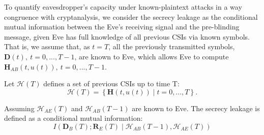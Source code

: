 To quantify eavesdropper's capacity under known-plaintext attacks in a way congruence with cryptanalysis, we consider the secrecy leakage as the conditional mutual information between the Eve's receiving signal and the pre-blinding message, given Eve has full knowledge of all previous CSIs via known symbols. That is, we assume that, as $t=T$, all the previously transmitted symbols, $\mathbf{D}(t),\ t = 0,...,T{-}1$, are known to Eve, which allows Eve to compute $\mathbf{H}_{AB}(t, u(t)),\ t = 0,...,T{-}1$. 

Let $\mathcal{H}(T)$ defines a set of previous CSIs up to time T:
\begin{equation}
    \mathcal{H}(T) = \left\{\mathbf{H}\left(t,u(t)\right) \mid t = 0,...,T \right\}.
\end{equation}

Assuming $\mathcal{H}_{AE}(T)$ and $\mathcal{H}_{AB}(T-1)$ are known to Eve. The secrecy leakage is defined as a conditional mutual information:
\begin{equation}
    I\left(\mathbf{D}_B(T);\mathbf{R}_E(T)\mid\mathcal{H}_{AB}(T-1),\mathcal{H}_{AE}(T)\right)
    \label{metric1}
\end{equation}

